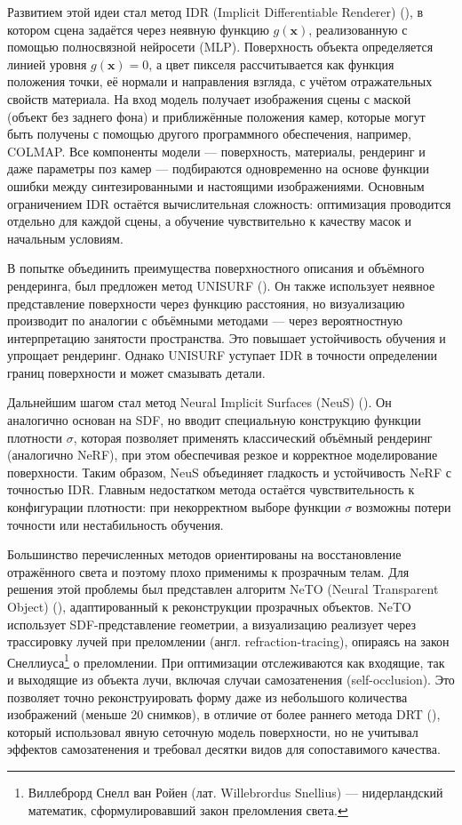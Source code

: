 Развитием этой идеи стал метод IDR (Implicit Differentiable Renderer)
(\cite{yariv2020multiviewneuralsurfacereconstruction}), в котором сцена задаётся
через неявную функцию $g(\mathbf{x})$, реализованную с помощью полносвязной
нейросети (MLP). Поверхность объекта определяется линией уровня $g(\mathbf{x}) =
0$, а цвет пикселя рассчитывается как функция положения точки, её нормали и
направления взгляда, с учётом отражательных свойств материала. На вход модель
получает изображения сцены с маской (объект без заднего фона) и приближённые
положения камер, которые могут быть получены с помощью другого программного
обеспечения, например, COLMAP. Все компоненты модели — поверхность, материалы,
рендеринг и даже параметры поз камер — подбираются одновременно на основе
функции ошибки между синтезированными и настоящими изображениями. Основным
ограничением IDR остаётся вычислительная сложность: оптимизация проводится
отдельно для каждой сцены, а обучение чувствительно к качеству масок и начальным
условиям.

В попытке объединить преимущества поверхностного описания и объёмного
рендеринга, был предложен метод UNISURF
(\cite{oechsle2021unisurfunifyingneuralimplicit}). Он также использует неявное
представление поверхности через функцию расстояния, но визуализацию производит
по аналогии с объёмными методами — через вероятностную интерпретацию занятости
пространства. Это повышает устойчивость обучения и упрощает рендеринг. Однако
UNISURF уступает IDR в точности определении границ поверхности и может смазывать
детали.

Дальнейшим шагом стал метод Neural Implicit Surfaces (NeuS)
(\cite{wang2023neuslearningneuralimplicit}). Он аналогично основан на SDF, но вводит
специальную конструкцию функции плотности $\sigma$, которая позволяет применять
классический объёмный рендеринг (аналогично NeRF), при этом обеспечивая резкое и
корректное моделирование поверхности. Таким образом, NeuS объединяет гладкость и
устойчивость NeRF с точностью IDR. Главным недостатком метода остаётся
чувствительность к конфигурации плотности: при некорректном выборе функции
$\sigma$ возможны потери точности или нестабильность обучения.

Большинство перечисленных методов ориентированы на восстановление отражённого
света и поэтому плохо применимы к прозрачным телам. Для решения этой проблемы
был представлен алгоритм NeTO (Neural Transparent Object)
(\cite{li2023netoneuralreconstructiontransparentobjects}), адаптированный к
реконструкции прозрачных объектов. NeTO использует SDF-представление геометрии,
а визуализацию реализует через трассировку
лучей при преломлении (англ. refraction-tracing), опираясь на закон Снеллиуса\footnote{Виллеброрд Снелл ван Ройен (лат.
Willebrordus Snellius) — нидерландский математик, сформулировавший закон
преломления света.} о преломлении. При оптимизации отслеживаются как входящие, так и
выходящие из объекта лучи, включая случаи самозатенения (self-occlusion). Это
позволяет точно реконструировать форму даже из небольшого количества изображений
(меньше 20 снимков), в отличие от более раннего метода DRT
(\cite{Lyu_2020}), который использовал явную сеточную модель поверхности, но не
учитывал эффектов самозатенения и требовал десятки видов для сопоставимого
качества.

